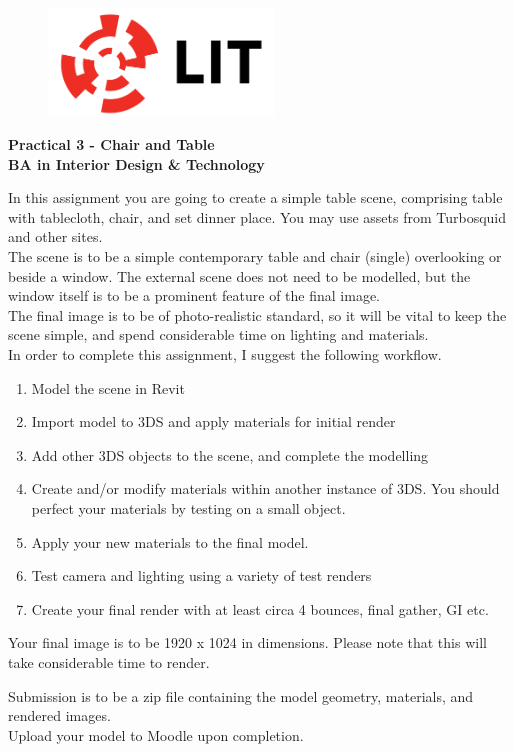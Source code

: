 
	

\newpage
\setcounter{page}{1}
\begin{center}
	\begin{figure}[ht]
		\centering
		\includegraphics[width = 6cm]{img/LITlogo.jpg}
		\label{fig:logoa3}
	\end{figure}
	\Large\textbf{Practical 3 - Chair and Table}\\
	\large\textbf{BA in Interior Design \& Technology}
\end{center}
In this assignment you are going to create a simple table scene, comprising table with tablecloth, chair, and set dinner place.  You may use assets from Turbosquid and other sites.\\

The scene is to be a simple contemporary table and chair (single) overlooking or beside a window.  The external scene does not need to be modelled, but the window itself is to be a prominent feature of the final image.\\

The final image is to be of photo-realistic standard, so it will be vital to keep the scene simple, and spend considerable time on lighting and materials.\\ 

In order to complete this assignment, I suggest the following workflow.  
\begin{enumerate}
	\item Model the scene in Revit
	\item Import model to 3DS and apply materials for initial render
	\item Add other 3DS objects to the scene, and complete the modelling
	\item Create and/or modify materials within another instance of 3DS.  You should perfect your materials by testing on a small object.
	\item Apply your new materials to the final model.
	\item Test camera and lighting using a variety of test renders
	\item Create your final render with at least circa 4 bounces, final gather, GI etc.
\end{enumerate}

Your final image is to be 1920 x 1024 in dimensions.  Please note that this will take considerable time to render.

Submission is to be a zip file containing the model geometry, materials, and rendered images.\\

Upload your model to Moodle upon completion.

